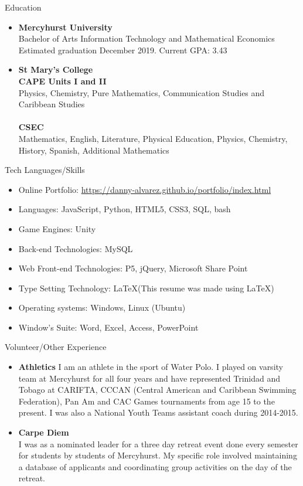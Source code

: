 \documentclass[11pt]{resume} %
\newcommand{\bold}[1]{\textbf{#1}}
\begin{document}
\begin{rSection}{Education}

\begin{itemize}
	\item\bold{Mercyhurst University}\\
	Bachelor of Arts Information Technology and  Mathematical Economics\\
	Estimated graduation December 2019. \quad Current GPA: 3.43\\
	
	\item\bold{St Mary’s College}\\
	\bold{CAPE Units I and II}\\
	Physics, Chemistry, Pure Mathematics, Communication Studies and Caribbean Studies\\
	\\
	\bold{CSEC}\\
	Mathematics, English, Literature, Physical Education, Physics, Chemistry, History, Spanish, Additional Mathematics\\
\end{itemize}
\end{rSection}
\vspace{1in}
\begin{rSection}{Tech Languages/Skills}
\begin{itemize}
	\item Online Portfolio: \url{https://danny-alvarez.github.io/portfolio/index.html}
	\item Languages: JavaScript, Python, HTML5, CSS3, SQL, bash
	\item Game Engines: Unity
	\item Back-end Technologies: MySQL
	\item Web Front-end Technologies: P5, jQuery, Microsoft Share Point
	\item Type Setting Technology: \LaTeX\xspace (This resume was made using \LaTeX)
	\item Operating systems: Windows, Linux (Ubuntu)
	\item Window's Suite: Word, Excel, Access, PowerPoint
\end{itemize}
\end{rSection}


\begin{rSection}{Volunteer/Other Experience}
	\begin{itemize}
		\item\bold{Athletics}
		I am an athlete in the sport of Water Polo. I played on varsity team at Mercyhurst for all four years and have represented Trinidad and Tobago at CARIFTA, CCCAN (Central American and Caribbean Swimming Federation), Pan Am and CAC Games tournaments from age 15 to the present. I was also a National Youth Teams assistant coach during 2014-2015. 
		\item\bold{Carpe Diem}\\
		I was as a nominated leader for a three day retreat event done every semester for students by students of Mercyhurst. My specific role involved maintaining a database of applicants and coordinating group activities on the day of the retreat. 
	\end{itemize}
\end{rSection}
\end{document}
